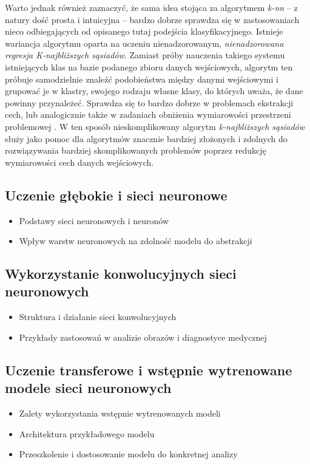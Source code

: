 \begin{itemize}
        Warto jednak również zaznaczyć, że sama idea stojąca za algorytmem \emph{k-nn} -- z natury dość prosta i intuicyjna -- bardzo dobrze sprawdza się w zastosowaniach nieco odbiegających od opisanego tutaj podejścia klasyfikacyjnego.
        Istnieje wariancja algorytmu oparta na uczeniu nienadzorowanym, \emph{nienadzorowana regresja K-najbliższych sąsiadów}.
        Zamiast próby nauczenia takiego systemu istniejących klas na bazie podanego zbioru danych wejściowych, algorytm ten próbuje samodzielnie znaleźć podobieństwa między danymi wejściowymi i grupować je w klastry, swojego rodzaju własne klasy, do których uważa, że dane powinny przynależeć.
        Sprawdza się to bardzo dobrze w problemach ekstrakcji cech, lub analogicznie także w zadaniach obniżenia wymiarowości przestrzeni problemowej \cite{wang2015accelerating}.
        W ten sposób nieskomplikowany algorytm \emph{k-najbliższych sąsiadów} służy jako pomoc dla algorytmów znacznie bardziej złożonych i zdolnych do rozwiązywania bardziej skomplikowanych problemów poprzez redukcję wymiarowości cech danych wejściowych.

\end{itemize}

\subsection{Uczenie głębokie i sieci neuronowe}

\begin{itemize}
  \item Podstawy sieci neuronowych i neuronów
  \item Wpływ warstw neuronowych na zdolność modelu do abstrakcji
\end{itemize}

\subsection{Wykorzystanie konwolucyjnych sieci neuronowych}

\begin{itemize}
  \item Struktura i działanie sieci konwolucyjnych
  \item Przykłady zastosowań w analizie obrazów i diagnostyce medycznej
\end{itemize}

\subsection{Uczenie transferowe i wstępnie wytrenowane modele sieci neuronowych}

\begin{itemize}
  \item Zalety wykorzystania wstępnie wytrenowanych modeli
  \item Architektura przykładowego modelu
  \item Przeszkolenie i dostosowanie modelu do konkretnej analizy
\end{itemize}
